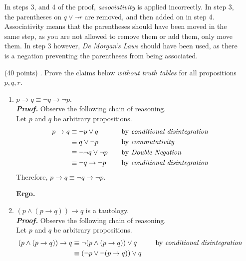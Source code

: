 \documentclass[11pt,a4paper]{article}
\begin{document}
\begin{enumerate}
    In steps 3, and 4 of the proof, \emph{associativity} is applied incorrectly. In step 3, the parentheses on $q \lor \neg r$ are removed, and then added on in step 4. Associativity means that the parentheses should have been moved in the same step, as you are not allowed to remove them or add them, only move them. In step 3 however, \emph{De Morgan's Laws} should have been used, as there is a negation preventing the parentheses from being associated. 
    \item[(40 points) \quad 2.]
    Prove the claims below \emph{without truth tables} for all propositions $p, q, r$.
    \begin{enumerate}
        \item 
        $p \rightarrow q \equiv \neg q \rightarrow \neg p$. \\
        \emph{\textbf{Proof.}} Observe the following chain of reasoning. \\ 
        Let $p$ and $q$ be arbitrary propositions.
    \begin{align*}
    p \rightarrow q
        &\equiv \neg p \lor q
            &\quad
            &\text{by \emph{conditional disintegration}} \\
        &\equiv q \lor \neg p
            &\quad
            &\text{by \emph{commutativity}} \\
        &\equiv \neg \neg q \lor \neg p
            &\quad
            &\text{by \emph{Double Negation}} \\
        &\equiv \neg q \rightarrow \neg p
            &\quad
            &\text{by \emph{conditional disintegration}}
    \end{align*}
    Therefore, $p \rightarrow q \equiv \neg q \rightarrow \neg p$. \\
        \begin{flushright}
            \textbf{Ergo.}
        \end{flushright}
        \item 
        $(p \land (p \rightarrow q)) \rightarrow q$ is a tautology. \\
        \emph{\textbf{Proof.}} Observe the following chain of reasoning. \\ 
        Let $p$ and $q$ be arbitrary propositions.
    \begin{align*}
    (p \land (p \rightarrow q)) \rightarrow q
        &\equiv \neg(p \land (p \rightarrow q)) \lor q
            &\quad
            &\text{by \emph{conditional disintegration}} \\
        &\equiv (\neg p \lor \neg(p \rightarrow q)) \lor q

\end{align*}
\end{enumerate}
\end{enumerate}
\end{document}
